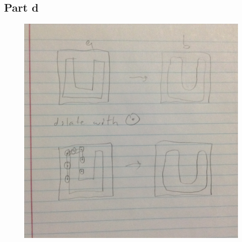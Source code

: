 \documentclass{article}
\begin{document}
	\subsection{Part d}
	\begin{figure}[H]
		\includegraphics[width=\linewidth]{9.5/fig4.JPG}
	\end{figure}
	
	\newpage
\end{document}
